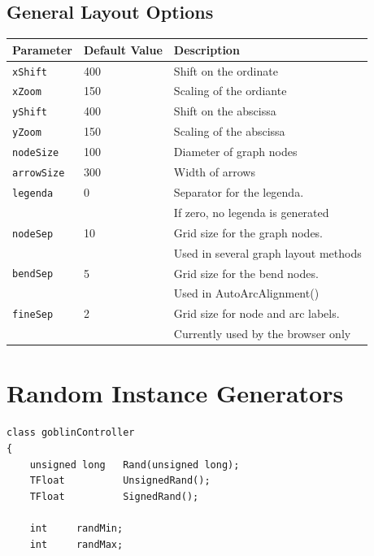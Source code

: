 \documentclass[a4paper,11pt,twoside]{book}
\begin{document}
\begin{multicols}{2}
\subsection{General Layout Options}
\label{slb_layout_options}
\medskip
\begin{center}
\begin{tabular}{|p{2cm}|p{2.7cm}|p{7cm}|}
\hline
{\bf Parameter} & {\bf Default Value} & {\bf Description} \\
\hline
\hline
\verb/xShift/   & 400 & Shift on the ordinate \\
\hline
\verb/xZoom/    & 150 & Scaling of the ordiante \\
\hline
\verb/yShift/   & 400 & Shift on the abscissa \\
\hline
\verb/yZoom/    & 150 & Scaling of the abscissa \\
\hline
\verb/nodeSize/ & 100 & Diameter of graph nodes \\
\hline
\verb/arrowSize/& 300 & Width of arrows \\
\hline
\verb/legenda/  & 0   & Separator for the legenda. \\
                & & If zero, no legenda is generated \\
\hline
\verb/nodeSep/  & 10  & Grid size for the graph nodes. \\
                & & Used in several graph layout methods \\
\hline
\verb/bendSep/  & 5  & Grid size for the bend nodes. \\
                & & Used in AutoArcAlignment() \\
\hline
\verb/fineSep/  & 2  & Grid size for node and arc labels. \\
                & & Currently used by the browser only \\
\hline
\end{tabular}
\end{center}
\bigskip



\newpage
\section{Random Instance Generators}
\label{slb_random}
\begin{mymethods}
\begin{verbatim}
class goblinController
{
    unsigned long   Rand(unsigned long);
    TFloat          UnsignedRand();
    TFloat          SignedRand();

    int     randMin;
    int     randMax;
    

\end{verbatim}
\end{mymethods}
\end{multicols}
\end{document}
